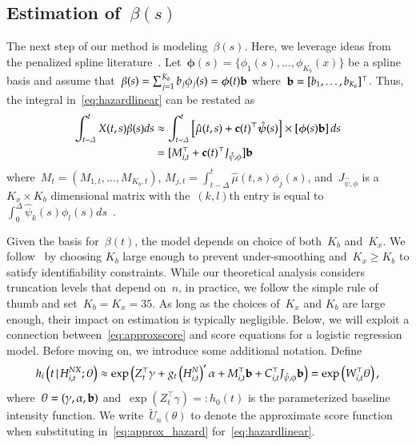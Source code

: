 \documentclass[11pt]{amsart}
\def\given{\, | \,}
\begin{document}
\subsection{Estimation of~$\beta(s)$}
\label{section:beta}

The next step of our method is modeling~$\beta(s)$. Here, we leverage ideas from the penalized spline literature~\citep{Ruppert2003, Wood2006book}. Let~$\mathbold{\phi} (s) = \{ \phi_1 (s), \ldots, \phi_{K_b} (x) \}$ be a spline basis and assume that~$\beta(s) = \sum_{j=1}^{K_b} b_j \phi_{j} (s) = \mathbold{\phi} (t) {\bf b}$ where~${\bf b} = [b_1, \ldots, b_{K_b}]^{\top}$. Thus, the integral in~\eqref{eq:hazardlinear} can be restated as
\begin{align*}
\int_{t-\Delta}^t X(t,s) \beta(s) ds
  &\approx \int_{t-\Delta}^t \left[ \hat \mu(t,s) + {\bf c} (t)^\top
    \mathbold{\hat \psi} (s) \right] \times \left[
    \mathbold{\phi} (s) {\bf b} \right] ds \\
  &= [ M_{i,t}^\top + {\bf c} (t)^\top J_{\hat \psi, \phi} ] {\bf b}
\end{align*}
where~$M_{t} = (M_{1,t}, \ldots, M_{K_b,t})$, $M_{j,t} = \int_{t-\Delta}^t \hat \mu (t,s) \phi_j (s)$, and~$J_{\hat \psi, \phi}$ is a $K_x \times K_b$ dimensional matrix with the~$(k,l)$th entry is equal to~$\int_{0}^\Delta \hat \psi_k (s) \phi_l (s) ds$~\citep{RamsaySilverman2005}.

Given the basis for~$\beta(t)$, the model depends on choice of both~$K_b$ and~$K_x$.  We follow~\cite{Ruppert2002} by choosing $K_b$ large enough to prevent under-smoothing and~$K_x \geq K_b$ to satisfy identifiability constraints. While our theoretical analysis considers truncation levels that depend on~$n$, in practice, we follow the simple rule of thumb and set~$K_b = K_x = 35$. As long as the choices of~$K_x$ and $K_b$ are large enough, their impact on estimation is typically negligible. Below, we will exploit a connection between~\eqref{eq:approxscore} and score equations for a logistic regression model.  Before moving on, we introduce some additional notation. Define
\begin{equation}
\label{eq:approx_hazard}
h_i \left( t \given  H_{i,t}^{NX} ; \theta \right) \approx
\exp \left( Z_{t}^\top \gamma + g_t \left( H_{i,t}^{N} \right)^{\prime} \alpha
  + M_{i,t}^\top {\bf b} + C_{i,t}^\top J_{\hat \psi, \phi} {\bf b} \right)
= \exp \left( W_{i,t}^\top \theta \right),
\end{equation}
where~$\theta = (\gamma, \alpha, {\bf b})$ and~$\exp ( Z_{t}^\top \gamma) =: h_0 (t)$ is the parameterized baseline intensity function. We write~$\tilde U_n (\theta)$ to denote the approximate score function when substituting in~\eqref{eq:approx_hazard} for~\eqref{eq:hazardlinear}.
\end{document}
